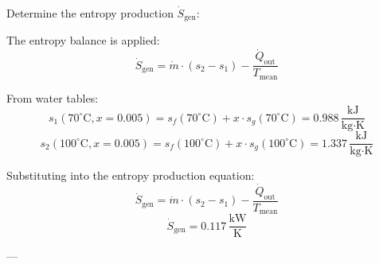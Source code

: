 Determine the entropy production \( \dot{S}_{\text{gen}} \):  

The entropy balance is applied:  
\[
\dot{S}_{\text{gen}} = \dot{m} \cdot (s_2 - s_1) - \frac{\dot{Q}_{\text{out}}}{T_{\text{mean}}}
\]  

From water tables:  
\[
s_1(70^\circ\text{C}, x = 0.005) = s_f(70^\circ\text{C}) + x \cdot s_g(70^\circ\text{C}) = 0.988 \, \frac{\text{kJ}}{\text{kg·K}}
\]  
\[
s_2(100^\circ\text{C}, x = 0.005) = s_f(100^\circ\text{C}) + x \cdot s_g(100^\circ\text{C}) = 1.337 \, \frac{\text{kJ}}{\text{kg·K}}
\]  

Substituting into the entropy production equation:  
\[
\dot{S}_{\text{gen}} = \dot{m} \cdot (s_2 - s_1) - \frac{\dot{Q}_{\text{out}}}{T_{\text{mean}}}
\]  
\[
\dot{S}_{\text{gen}} = 0.117 \, \frac{\text{kW}}{\text{K}}
\]  

---